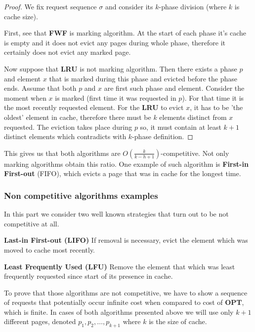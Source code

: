 \begin{proof}
 We fix request sequence $\sigma$ and consider its $k$-phase division 
(where $k$ is cache size).

First, see that \textbf{FWF} is marking algorithm. At the start of each phase 
it's cache is empty and it does not evict any pages during whole phase, 
therefore it certainly does not evict any marked page.

Now suppose that \textbf{LRU} is not marking algorithm. Then there exists a 
phase $p$ and element $x$ that is marked during this phase and evicted before 
the phase ends. Assume that both $p$ and $x$ are first such phase and element. 
Consider the moment when $x$ is marked (first time it was requested in $p$). 
For that time it is the most recently requested element. For the \textbf{LRU} to 
evict $x$, it has to be 'the oldest' element in cache, therefore there must be 
$k$ elements distinct from $x$ requested. The eviction takes place 
during $p$ so, it must contain 
at least $k+1$ distinct elements which contradicts with $k$-phase definition. 
\end{proof}
This gives us that both algorithms are $O(\frac{k}{k-h+1})$-competitive. Not 
only marking algorithms obtain this ratio. One example of such algorithm is 
\textbf{First-in First-out} (FIFO), which evicts a page that was in cache for 
the longest time.

\subsubsection{Non competitive algorithms examples}
In this part we consider two well known strategies that turn out to be not 
competitive at all.
\begin{myalgo}
 \textbf{Last-in First-out (LIFO)}
 \newline
If removal is necessary, evict the element which was moved to cache most 
recently.
\end{myalgo}
\begin{myalgo}
 \textbf{Least Frequently Used (LFU)}
 \newline
Remove the element that which was least frequently requested since start of its 
presence in cache.
\end{myalgo}

To prove that those algorithms are not competitive, we have to show a sequence 
of requests that potentially occur infinite cost when compared to cost of 
\textbf{OPT}, which is finite. In cases of both algorithms presented above we 
will use only 
$k+1$ different pages, denoted $p_1, p_2, \ldots, p_{k+1}$ where $k$ is the 
size of cache.

